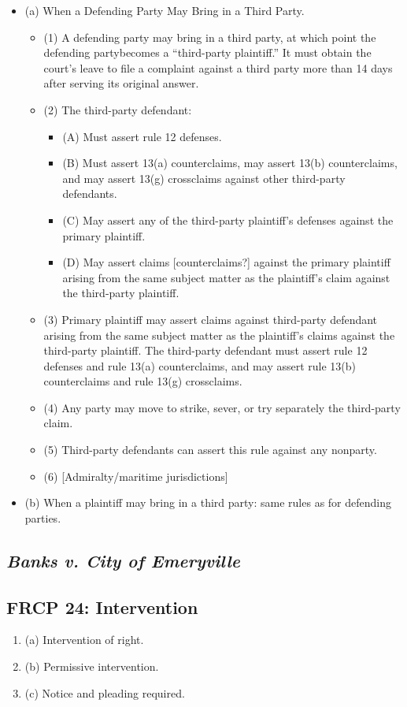 \begin{itemize}
    \item (a) When a Defending Party May Bring in a Third Party.
    \begin{itemize}
        \item (1) A defending party may bring in a third party, at which point 
        the defending partybecomes a ``third-party plaintiff.'' It must obtain 
        the court's leave to file a complaint against a third party more than 
        14 days after serving its original answer.
        \item (2) The third-party defendant:
        \begin{itemize}
            \item (A) Must assert rule 12 defenses.
            \item (B) Must assert 13(a) counterclaims, may assert 13(b) 
            counterclaims, and may assert 13(g) crossclaims against other 
            third-party defendants.
            \item (C) May assert any of the third-party plaintiff's defenses 
            against the primary plaintiff.
            \item (D) May assert claims [counterclaims?] against the primary 
            plaintiff arising from the same subject matter as the plaintiff's 
            claim against the third-party plaintiff.
        \end{itemize}
        \item (3) Primary plaintiff may assert claims against third-party 
        defendant arising from the same subject matter as the plaintiff's 
        claims against the third-party plaintiff. The third-party defendant 
        must assert rule 12 defenses and rule 13(a) counterclaims, and may 
        assert rule 13(b) counterclaims and rule 13(g) crossclaims.
        \item (4) Any party may move to strike, sever, or try separately the 
        third-party claim.
        \item (5) Third-party defendants can assert this rule against any 
        nonparty.
        \item (6) [Admiralty/maritime jurisdictions]
    \end{itemize}
    \item (b) When a plaintiff may bring in a third party: same rules as for 
    defending parties.
\end{itemize}

\subsection{\emph{Banks v. City of Emeryville}}

\subsection{FRCP 24: Intervention}

\begin{enumerate}
    \item (a) Intervention of right.
    \item (b) Permissive intervention.
    \item (c) Notice and pleading required.
\end{enumerate}
